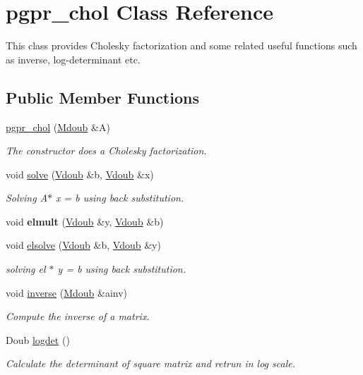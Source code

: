 \hypertarget{classpgpr__chol}{\section{pgpr\+\_\+chol Class Reference}
\label{classpgpr__chol}
}


This class provides Cholesky factorization and some related useful functions such as inverse, log-\/determinant etc.  


\subsection*{Public Member Functions}
\begin{DoxyCompactItemize}
\item 
\hyperlink{classpgpr__chol_ade89a39def082f6de79df242a39fad67}{pgpr\+\_\+chol} (\hyperlink{classpgpr__matrix}{Mdoub} \&A)
\begin{DoxyCompactList}\small\item\em The constructor does a Cholesky factorization. \end{DoxyCompactList}\item 
void \hyperlink{classpgpr__chol_a567b23e2e93a85675de26550d5e4cb38}{solve} (\hyperlink{classpgpr__vector}{Vdoub} \&b, \hyperlink{classpgpr__vector}{Vdoub} \&x)
\begin{DoxyCompactList}\small\item\em Solving A$\ast$ x = b using back substitution. \end{DoxyCompactList}\item 
\hypertarget{classpgpr__chol_aba5c1f9eb3157d703a3d2c2ccba83493}{void {\bfseries elmult} (\hyperlink{classpgpr__vector}{Vdoub} \&y, \hyperlink{classpgpr__vector}{Vdoub} \&b)}\label{classpgpr__chol_aba5c1f9eb3157d703a3d2c2ccba83493}

\item 
void \hyperlink{classpgpr__chol_a365839254c16b047b2e36a7937b8593f}{elsolve} (\hyperlink{classpgpr__vector}{Vdoub} \&b, \hyperlink{classpgpr__vector}{Vdoub} \&y)
\begin{DoxyCompactList}\small\item\em solving el $\ast$ y = b using back substitution. \end{DoxyCompactList}\item 
void \hyperlink{classpgpr__chol_a8da419135a59362c31674091b0bfcf89}{inverse} (\hyperlink{classpgpr__matrix}{Mdoub} \&ainv)
\begin{DoxyCompactList}\small\item\em Compute the inverse of a matrix. \end{DoxyCompactList}\item 
Doub \hyperlink{classpgpr__chol_a72827b33f276569fa6c3c8f2af80c40e}{logdet} ()
\begin{DoxyCompactList}\small\item\em Calculate the determinant of square matrix and retrun in log scale. \end{DoxyCompactList}\end{DoxyCompactItemize}


